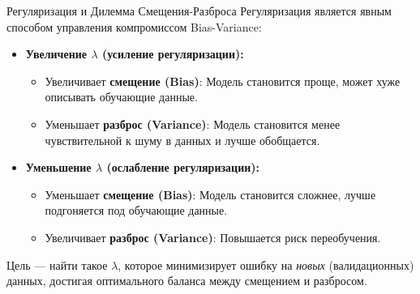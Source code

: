 \begin{alerttextbox}{Регуляризация и Дилемма Смещения-Разброса}
    Регуляризация является явным способом управления компромиссом Bias-Variance:
    \begin{itemize}[nosep, leftmargin=*]
        \item \textbf{Увеличение $\lambda$ (усиление регуляризации):}
            \begin{itemize}[label=\textbullet, nosep]
                 \item Увеличивает \textbf{смещение (Bias)}: Модель становится проще, может хуже описывать обучающие данные.
                 \item Уменьшает \textbf{разброс (Variance)}: Модель становится менее чувствительной к шуму в данных и лучше обобщается.
            \end{itemize}
        \item \textbf{Уменьшение $\lambda$ (ослабление регуляризации):}
            \begin{itemize}[label=\textbullet, nosep]
                 \item Уменьшает \textbf{смещение (Bias)}: Модель становится сложнее, лучше подгоняется под обучающие данные.
                 \item Увеличивает \textbf{разброс (Variance)}: Повышается риск переобучения.
            \end{itemize}
    \end{itemize}
    Цель — найти такое $\lambda$, которое минимизирует ошибку на \textit{новых} (валидационных) данных, достигая оптимального баланса между смещением и разбросом.
\end{alerttextbox}